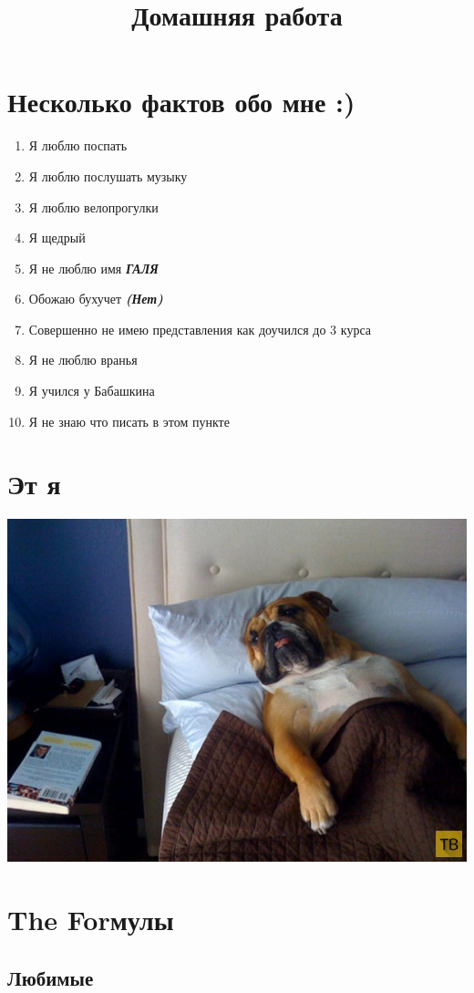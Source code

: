 \documentclass[12pt, a4paper]{article}
\begin{document}
 \pagecolor[rgb]{1,0.97,0.82}
\title{Домашняя работа}
\tableofcontents
\newpage
\section{Несколько фактов обо мне :) }
\begin{enumerate}
\item Я люблю поспать
\item Я люблю послушать музыку
\item Я люблю велопрогулки
\item Я щедрый
\item Я не люблю имя {\it {\bf ГАЛЯ}}
\item Обожаю бухучет \textbf{\textit{(Нет)}}
\item Совершенно не имею представления как доучился до 3 курса
\item Я не люблю вранья
\item Я учился у Бабашкина
\item Я не знаю что писать в этом пункте
\end{enumerate}
\newpage
\section{{\bf Эт я}}
\includegraphics[scale=0.65]{doge.jpg}
\newpage
\section{The Forмулы}
\subsection{Любимые}
\end{document}
